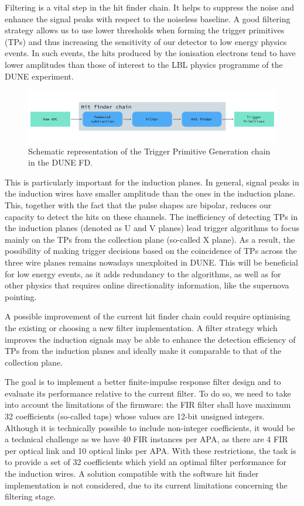 Filtering is a vital step in the hit finder chain. It helps to suppress the noise and enhance the signal peaks with respect to the noiseless baseline. A good filtering strategy allows us to use lower thresholds when forming the trigger primitives (TPs) and thus increasing the sensitivity of our detector to low energy physics events. In such events, the hits produced by the ionisation electrons tend to have lower amplitudes than those of interest to the LBL physics programme of the DUNE experiment.

\begin{figure}[t]
	\centering
	\includegraphics[width=0.99\linewidth]{Images/Matched_Filter/trigger_primitive_chain.pdf}
	\caption{Schematic representation of the Trigger Primitive Generation chain in the DUNE FD.}
	\label{fig:tpg_chain}
\end{figure}

This is particularly important for the induction planes. In general, signal peaks in the induction wires have smaller amplitude than the ones in the induction plane. This, together with the fact that the pulse shapes are bipolar, reduces our capacity to detect the hits on these channels. The inefficiency of detecting TPs in the induction planes (denoted as U and V planes) lead trigger algorithms to focus mainly on the TPs from the collection plane (so-called X plane). As a result, the possibility of making trigger decisions based on the coincidence of TPs across the three wire planes remains nowadays unexploited in DUNE. This will be beneficial for low energy events, as it adds redundancy to the algorithms, as well as for other physics that requires online directionality information, like the supernova pointing.

A possible improvement of the current hit finder chain could require optimising the existing or choosing a new filter implementation. A filter strategy which improves the induction signals may be able to enhance the detection efficiency of TPs from the induction planes and ideally make it comparable to that of the collection plane.  

The goal is to implement a better finite-impulse response filter design and to evaluate its performance relative to the current filter. To do so, we need to take into account the limitations of the firmware: the FIR filter shall have maximum 32 coefficients (so-called taps) whose values are 12-bit unsigned integers. Although it is technically possible to include non-integer coefficients, it would be a technical challenge as we have 40 FIR instances per APA, as there are 4 FIR per optical link and 10 optical links per APA. With these restrictions, the task is to provide a set of 32 coefficients which yield an optimal filter performance for the induction wires. A solution compatible with the software hit finder implementation is not considered, due to its current limitations concerning the filtering stage.

